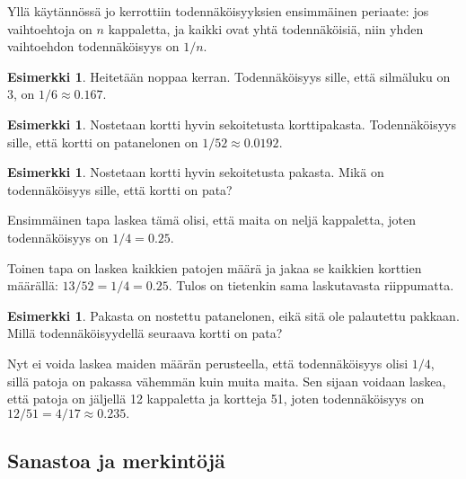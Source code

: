 \documentclass[12pt,leqno,a4paper,oneside]{amsart}
\theoremstyle{definition}
\newtheorem{example}[proclaim]{Esimerkki}
\theoremstyle{remark}
\numberwithin{equation}{section}
\begin{document}
Yllä käytännössä jo kerrottiin todennäköisyyksien ensimmäinen periaate: jos vaihtoehtoja on $n$ kappaletta, ja kaikki ovat yhtä todennäköisiä, niin
yhden vaihtoehdon todennäköisyys on $1/n$.

\begin{example}
 Heitetään noppaa kerran. Todennäköisyys sille, että silmäluku on 3, on $1/6\approx 0.167.$
\end{example}

\begin{example}
 Nostetaan kortti hyvin sekoitetusta korttipakasta. Toden\-näköisyys sille, että kortti on patanelonen on $1/52\approx 0.0192.$
\end{example}

\begin{example}
 Nostetaan kortti hyvin sekoitetusta pakasta. Mikä on todennäköisyys sille, että kortti on pata?
 
 Ensimmäinen tapa laskea tämä olisi, että maita on neljä kappaletta, joten todennäköisyys on $1/4 = 0.25.$ 
 
 Toinen tapa on laskea kaikkien patojen määrä ja jakaa se kaikkien korttien määrällä: $13/52 = 1/4 = 0.25.$ Tulos on tietenkin sama laskutavasta riippumatta.
\end{example}

\begin{example}
 Pakasta on nostettu patanelonen, eikä sitä ole palautettu pakkaan. Millä todennäköisyydellä seuraava kortti on pata?
 
 Nyt ei voida laskea maiden määrän perusteella, että todennäköisyys olisi $1/4$, sillä patoja on pakassa vähemmän kuin muita maita. Sen sijaan voidaan laskea,
 että patoja on jäljellä 12 kappaletta ja kortteja 51, joten todennäköisyys on $12/51 = 4/17 \approx 0.235.$
\end{example}




\subsection{Sanastoa ja merkintöjä}
\end{document}
